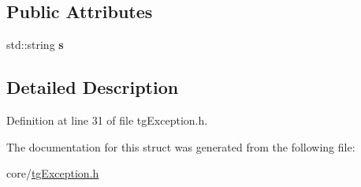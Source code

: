 \subsection*{Public Attributes}
\begin{DoxyCompactItemize}
\item 
\hypertarget{structtg_exception_ab91f7c37d05171544e219a1e0e8a7d88}{std\-::string {\bfseries s}}\label{structtg_exception_ab91f7c37d05171544e219a1e0e8a7d88}

\end{DoxyCompactItemize}


\subsection{Detailed Description}


Definition at line 31 of file tg\-Exception.\-h.



The documentation for this struct was generated from the following file\-:\begin{DoxyCompactItemize}
\item 
core/\hyperlink{tg_exception_8h}{tg\-Exception.\-h}\end{DoxyCompactItemize}
